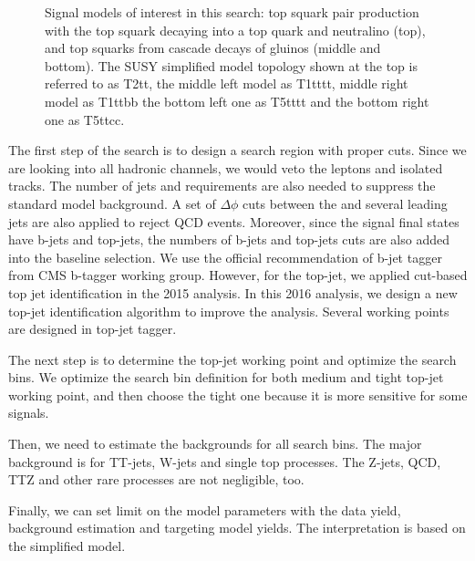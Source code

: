 \begin{figure}[ht!]
\begin{centering}
\caption{Signal models of interest in this search:
top squark pair production with the top squark decaying into a top quark and
neutralino (top),
and top squarks from cascade decays of gluinos (middle and bottom).
The SUSY simplified model topology shown at the top is referred to as T2tt,
the middle left model as T1tttt, middle right model as T1ttbb
the bottom left one as T5tttt and the bottom right one as T5ttcc.}
\label{fig:signal_diagrams}
\end{centering}
\end{figure}

The first step of the search is to design a search region with proper cuts. Since we are looking into all hadronic channels, we would veto the leptons and isolated tracks. The number of jets and \MET requirements are also needed to suppress the standard model background. A set of $\Delta\phi$ cuts between the \MET and several leading jets are also applied to reject QCD events. Moreover, since the signal final states have b-jets and top-jets, the numbers of b-jets and top-jets cuts are also added into the baseline selection. We use the official recommendation of b-jet tagger from CMS b-tagger working group. However, for the top-jet, we applied cut-based top jet identification in the 2015 analysis\cite{PhysRevD.96.012004}. In this 2016 analysis, we design a new top-jet identification algorithm to improve the analysis. Several working points are designed in top-jet tagger.

The next step is to determine the top-jet working point and optimize the search bins. We optimize the search bin definition for both medium and tight top-jet working point, and then choose the tight one because it is more sensitive for some signals.

Then, we need to estimate the backgrounds for all search bins. The major background is for TT-jets, W-jets and single top processes. The Z-jets, QCD, TTZ and other rare processes are not negligible, too.

Finally, we can set limit on the model parameters with the data yield, background estimation and targeting model yields. The interpretation is based on the simplified model\cite{Alwall:2008ag}.

